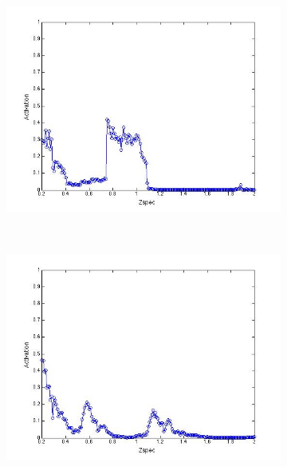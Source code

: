 \documentclass[useAMS,usenatbib,fleqn]{mn2e}
\begin{document}
\begin{figure}
        \begin{subfigure}[b]{0.075\textwidth}
                \includegraphics[trim = 35px 15px 50px 25px, clip=true,width=\textwidth]{activation_01.jpg}
        \end{subfigure}
	~
        \begin{subfigure}[b]{0.075\textwidth}
                \includegraphics[trim = 35px 15px 50px 25px, clip=true,width=\textwidth]{activation_02.jpg}
        \end{subfigure}
        ~
        \begin{subfigure}[b]{0.075\textwidth}

\end{subfigure}
\end{figure}
\end{document}
